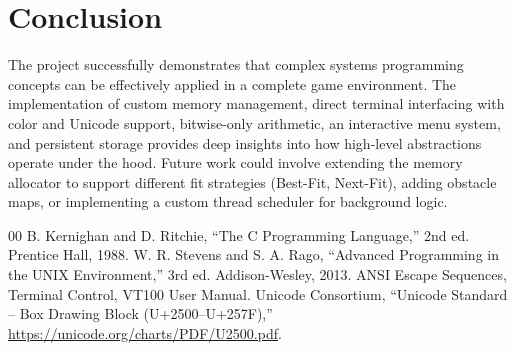 \documentclass[conference]{IEEEtran}
\begin{document}
\section{Conclusion}
The project successfully demonstrates that complex systems programming concepts can be effectively applied in a complete game environment. The implementation of custom memory management, direct terminal interfacing with color and Unicode support, bitwise-only arithmetic, an interactive menu system, and persistent storage provides deep insights into how high-level abstractions operate under the hood. Future work could involve extending the memory allocator to support different fit strategies (Best-Fit, Next-Fit), adding obstacle maps, or implementing a custom thread scheduler for background logic.

\begin{thebibliography}{00}
 B. Kernighan and D. Ritchie, ``The C Programming Language,'' 2nd ed. Prentice Hall, 1988.
 W. R. Stevens and S. A. Rago, ``Advanced Programming in the UNIX Environment,'' 3rd ed. Addison-Wesley, 2013.
 ANSI Escape Sequences, Terminal Control, VT100 User Manual.
 Unicode Consortium, ``Unicode Standard -- Box Drawing Block (U+2500--U+257F),'' \url{https://unicode.org/charts/PDF/U2500.pdf}.
\end{thebibliography}
\end{document}
